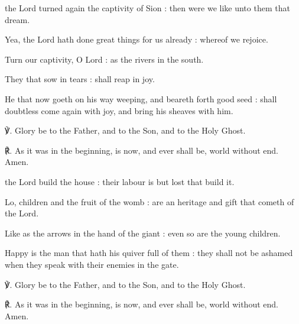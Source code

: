 \begin{multicols}{2}

 the Lord turned again the captivity of Sion : then were we like unto them that dream.\par
{}
Yea, the Lord hath done great things for us already : whereof we rejoice.\par
{}Turn our captivity, O Lord : as the rivers in the south.\par
{}They that sow in tears : shall reap in joy.\par
{}He that now goeth on his way weeping, and beareth forth good seed : shall doubtless come again with joy, and bring his sheaves with him.\par
℣. Glory be to the Father, and to the Son, and to the Holy Ghost.\par
℟. As it was in the beginning, is now, and ever shall be, world without end. Amen.


 the Lord build the house : their labour is but lost that build it.\par
{}
Lo, children and the fruit of the womb : are an heritage and gift that cometh of the Lord.\par
{}Like as the arrows in the hand of the giant : even so are the young children.\par
{}Happy is the man that hath his quiver full of them : they shall not be ashamed when they speak with their enemies in the gate.\par
℣. Glory be to the Father, and to the Son, and to the Holy Ghost.\par
℟. As it was in the beginning, is now, and ever shall be, world without end. Amen.



\end{multicols}

